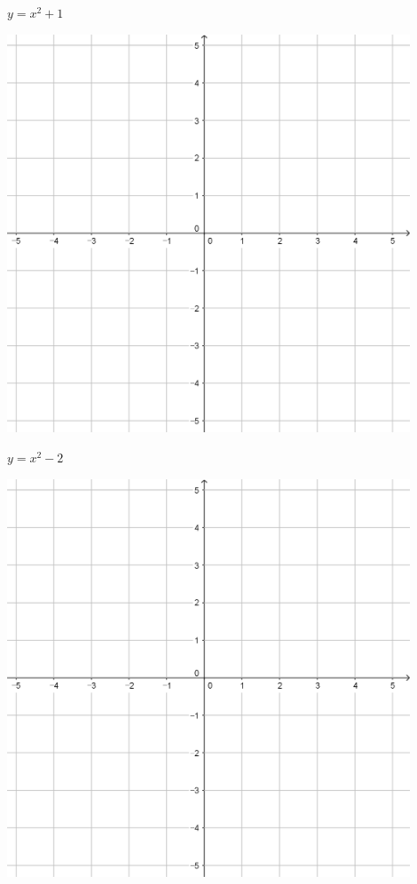 \documentclass{oblivoir}
\begin{document}
\begin{minipage}{0.45\textwidth}\centering
\(y=x^2+1\)
\par\bigskip\includegraphics[width=0.9\textwidth]{55}
\end{minipage}
\begin{minipage}{0.45\textwidth}\centering
\(y=x^2-2\)
\par\bigskip\includegraphics[width=0.9\textwidth]{55}
\end{minipage}\bigskip\bigskip\par
\end{document}
